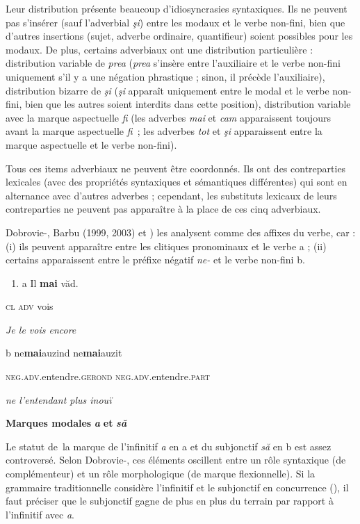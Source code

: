 Leur distribution présente beaucoup d'idiosyncrasies syntaxiques. Ils ne peuvent pas s'insérer (sauf l'adverbial \textit{şi}) entre les modaux et le verbe non-fini, bien que d'autres insertions (sujet, adverbe ordinaire, quantifieur) soient possibles pour les modaux. De plus, certains adverbiaux ont une distribution particulière : distribution variable de \textit{prea} (\textit{prea} s'insère entre l'auxiliaire et le verbe non-fini uniquement s'il y a une négation phrastique ; sinon, il précède l'auxiliaire), distribution bizarre de \textit{şi} (\textit{şi} apparaît uniquement entre le modal et le verbe non-fini, bien que les autres soient interdits dans cette position), distribution variable avec la marque aspectuelle \textit{fi} (les adverbes \textit{mai} et\textit{ cam} apparaissent toujours avant la marque aspectuelle \textit{fi~}; les adverbes \textit{tot} et\textit{ şi} apparaissent entre la marque aspectuelle et le verbe non-fini).

Tous ces items adverbiaux ne peuvent être coordonnés. Ils ont des contreparties lexicales (avec des propriétés syntaxiques et sémantiques différentes) qui sont en alternance avec d'autres adverbes ; cependant, les substituts lexicaux de leurs contreparties ne peuvent pas apparaître à la place de ces cinq adverbiaux. 

Dobrovie-\citet{Sorin1994}, Barbu (1999, 2003) et \citet{Monachesi2000}) les analysent comme des affixes du verbe, car : (i) ils peuvent apparaître entre les clitiques pronominaux et le verbe a ; (ii) certains apparaissent entre le préfixe négatif \textit{ne-} et le verbe non-fini b. 


\begin{enumerate}
\item \label{bkm:Ref299297884}a  Il  \textbf{mai}  văd. 


\end{enumerate}
\textsc{cl  adv}  vois

{\itshape
Je le vois encore}

b  ne\textbf{mai}auzind  {\textbar} ne\textbf{mai}auzit

  \textsc{neg.adv.}entendre.\textsc{gerond}  {\textbar} \textsc{neg.adv.}entendre.\textsc{part}

  \textit{ne l'entendant plus {\textbar} inouï} 

\textbf{Marques modales} \textbf{\textit{a} }\textbf{et} \textbf{\textit{să}}

Le statut de~la marque de l'infinitif \textit{a} en a et du subjonctif \textit{să} en b est assez controversé. Selon Dobrovie-\citet{Sorin1994}, ces éléments oscillent entre un rôle syntaxique (de complémenteur) et un rôle morphologique (de marque flexionnelle). Si la grammaire traditionnelle considère l'infinitif et le subjonctif en concurrence (\citet{Avram2001}), il faut préciser que le subjonctif gagne de plus en plus du terrain par rapport à l'infinitif avec \textit{a}.  


